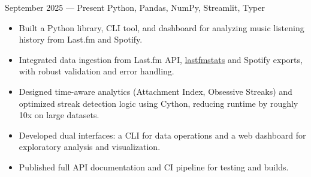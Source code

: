 
{September 2025 --- Present}
{Python, Pandas, NumPy, Streamlit, Typer}
\begin{itemize}
    \item Built a Python library, CLI tool, and dashboard for analyzing music listening history from Last.fm and Spotify.
    \item Integrated data ingestion from Last.fm API, \href{https://www.lastfmstats.com}{lastfmstats} and Spotify exports, with robust validation and error handling.
    \item Designed time-aware analytics (Attachment Index, Obsessive Streaks) and optimized streak detection logic using Cython, 
    reducing runtime by roughly 10x on large datasets.
    \item Developed dual interfaces: a CLI for data operations and a web dashboard for exploratory analysis and visualization.
    \item Published full API documentation and CI pipeline for testing and builds.
  \end{itemize}
